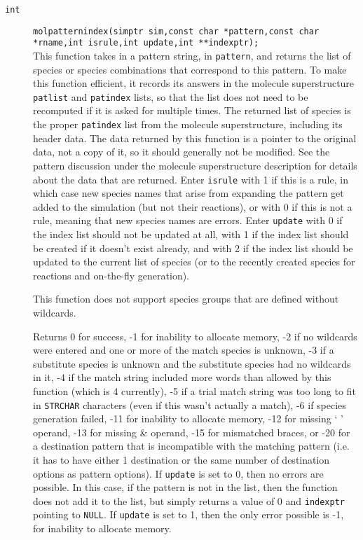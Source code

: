 \documentclass {book}
\begin{document}
\begin{description}
\item[\texttt{int}]
\texttt{molpatternindex(simptr sim,const char *pattern,const char *rname,int isrule,int update,int **indexptr);} \\
This function takes in a pattern string, in \texttt{pattern}, and returns the list of species or species combinations that correspond to this pattern.  To make this function efficient, it records its answers in the molecule superstructure \texttt{patlist} and \texttt{patindex} lists, so that the list does not need to be recomputed if it is asked for multiple times.  The returned list of species is the proper \texttt{patindex} list from the molecule superstructure, including its header data.  The data returned by this function is a pointer to the original data, not a copy of it, so it should generally not be modified.  See the pattern discussion under the molecule superstructure description for details about the data that are returned.  Enter \texttt{isrule} with 1 if this is a rule, in which case new species names that arise from expanding the pattern get added to the simulation (but not their reactions), or with 0 if this is not a rule, meaning that new species names are errors.  Enter \texttt{update} with 0 if the index list should not be updated at all, with 1 if the index list should be created if it doesn't exist already, and with 2 if the index list should be updated to the current list of species (or to the recently created species for reactions and on-the-fly generation).

This function does not support species groups that are defined without wildcards.

Returns 0 for success, -1 for inability to allocate memory, -2 if no wildcards were entered and one or more of the match species is unknown, -3 if a substitute species is unknown and the substitute species had no wildcards in it, -4 if the match string included more words than allowed by this function (which is 4 currently), -5 if a trial match string was too long to fit in \texttt{STRCHAR} characters (even if this wasn't actually a match), -6 if species generation failed, -11 for inability to allocate memory, -12 for missing ` ' operand, -13 for missing \& operand, -15 for mismatched braces, or -20 for a destination pattern that is incompatible with the matching pattern (i.e. it has to have either 1 destination or the same number of destination options as pattern options).  If \texttt{update} is set to 0, then no errors are possible.  In this case, if the pattern is not in the list, then the function does not add it to the list, but simply returns a value of 0 and \texttt{indexptr} pointing to \texttt{NULL}.  If \texttt{update} is set to 1, then the only error possible is -1, for inability to allocate memory.


\end{description}
\end{document}
